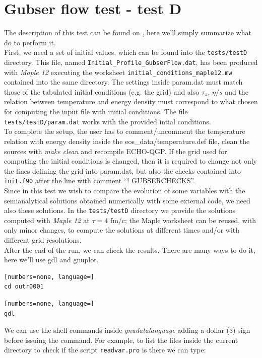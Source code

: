 \section{Gubser flow test - test D}
The description of this test can be found on \cite{Marrochio:2013wla} \cite{Becattini:2015ska}, here we'll simply summarize what do to perform it.\\
First, we need a set of initial values, which can be found into the {\tt tests/testD} directory. This file, named {\tt Initial\_Profile\_GubserFlow.dat}, has been produced with \emph{Maple 12} executing the worksheet {\tt initial\_conditions\_maple12.mw} contained into the same directory.
The settings inside param.dat must match those of the tabulated initial conditions (e.g. the grid) and also $\tau_{\pi}$, $\eta/s$ and the relation between temperature and energy density must correspond to what chosen for computing the input file with initial conditions. The file {\tt tests/testD/param.dat} works with the provided intial conditions.\\
To complete the setup, the user has to comment/uncomment the temperature relation with energy density inside the eos\_data/temperature.def file, clean the sources with \emph{make clean} and recompile ECHO-QGP. If the grid used for computing the initial conditions is changed, then it is required to change not only the lines defining the grid into param.dat, but also the checks contained into {\tt init.f90} after the line with comment ``! GUBSERCHECKS''.\\
Since in this test we wish to compare the evolution of some variables with the semianalytical solutions obtained numerically with some external code, we need also these solutions. In the {\tt tests/testD} directory we provide the solutions computed with \emph{Maple 12} at $\tau=4$ fm/c; the Maple worksheet can be reused, with only minor changes, to compute the solutions at different times and/or with different grid resolutions.\\
After the end of the run, we can check the results. There are many ways to do it, here we'll use gdl and gnuplot.\\
\begin{lstlisting}[numbers=none, language=]
cd outr0001
\end{lstlisting}
\begin{lstlisting}[numbers=none, language=]
gdl
\end{lstlisting}
We can use the shell commands inside \emph{gnudatalanguage} adding a dollar (\$) sign before issuing the command. For example, to list the files inside the current directory to check if the script {\tt readvar.pro} is there we can type:
